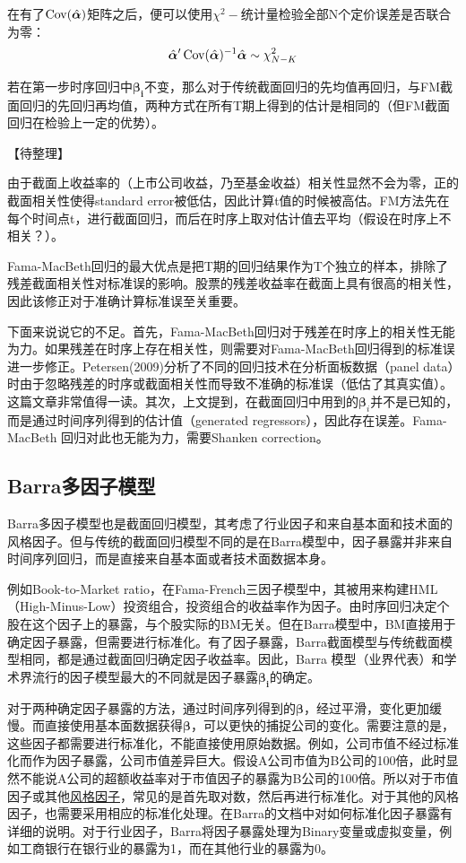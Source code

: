 \documentclass[11pt]{article}
\begin{document}
在有了$\operatorname{Cov}(\hat{\bm{\alpha}})$矩阵之后，便可以使用$\chi^2-$统计量检验全部N个定价误差是否联合为零：
\begin{equation*}
    \hat{\bm{\alpha}}' \operatorname{Cov}(\hat{\bm{\alpha}})^{-1} \hat{\bm{\alpha}} \sim \chi_{N-K}^{2}
\end{equation*}

若在第一步时序回归中$\bm{\beta_i}$不变，那么对于传统截面回归的先均值再回归，与FM截面回归的先回归再均值，两种方式在所有T期上得到的估计是相同的（但FM截面回归在检验上一定的优势）。

【待整理】

由于截面上收益率的（上市公司收益，乃至基金收益）相关性显然不会为零，正的截面相关性使得standard error被低估，因此计算t值的时候被高估。FM方法先在每个时间点t，进行截面回归，而后在时序上取对估计值去平均（假设在时序上不相关？）。

Fama-MacBeth回归的最大优点是把T期的回归结果作为T个独立的样本，排除了残差截面相关性对标准误的影响。股票的残差收益率在截面上具有很高的相关性，因此该修正对于准确计算标准误至关重要。

下面来说说它的不足。首先，Fama-MacBeth回归对于残差在时序上的相关性无能为力。如果残差在时序上存在相关性，则需要对Fama-MacBeth回归得到的标准误进一步修正。Petersen(2009)分析了不同的回归技术在分析面板数据（panel data）时由于忽略残差的时序或截面相关性而导致不准确的标准误（低估了其真实值）。这篇文章非常值得一读。其次，上文提到，在截面回归中用到的$\bm{\beta}_i$并不是已知的，而是通过时间序列得到的估计值（generated regressors），因此存在误差。Fama-MacBeth 回归对此也无能为力，需要Shanken correction。

\subsection{Barra多因子模型}

Barra多因子模型也是截面回归模型，其考虑了行业因子和来自基本面和技术面的风格因子。但与传统的截面回归模型不同的是在Barra模型中，因子暴露并非来自时间序列回归，而是直接来自基本面或者技术面数据本身。

例如Book-to-Market ratio，在Fama-French三因子模型中，其被用来构建HML（High-Minus-Low）投资组合，投资组合的收益率作为因子。由时序回归决定个股在这个因子上的暴露，与个股实际的BM无关。但在Barra模型中，BM直接用于确定因子暴露，但需要进行标准化。有了因子暴露，Barra截面模型与传统截面模型相同，都是通过截面回归确定因子收益率。因此，Barra 模型（业界代表）和学术界流行的因子模型最大的不同就是因子暴露$\bm{\beta_i}$的确定。

对于两种确定因子暴露的方法，通过时间序列得到的$\bm{\beta}$，经过平滑，变化更加缓慢。而直接使用基本面数据获得$\bm{\beta}$，可以更快的捕捉公司的变化。需要注意的是，这些因子都需要进行标准化，不能直接使用原始数据。例如，公司市值不经过标准化而作为因子暴露，公司市值差异巨大。假设A公司市值为B公司的100倍，此时显然不能说A公司的超额收益率对于市值因子的暴露为B公司的100倍。所以对于市值因子或其他\uline{风格因子}，常见的是首先取对数，然后再进行标准化。对于其他的风格因子，也需要采用相应的标准化处理。在Barra的文档中对如何标准化因子暴露有详细的说明。对于行业因子，Barra将因子暴露处理为Binary变量或虚拟变量，例如工商银行在银行业的暴露为1，而在其他行业的暴露为0。
\end{document}
